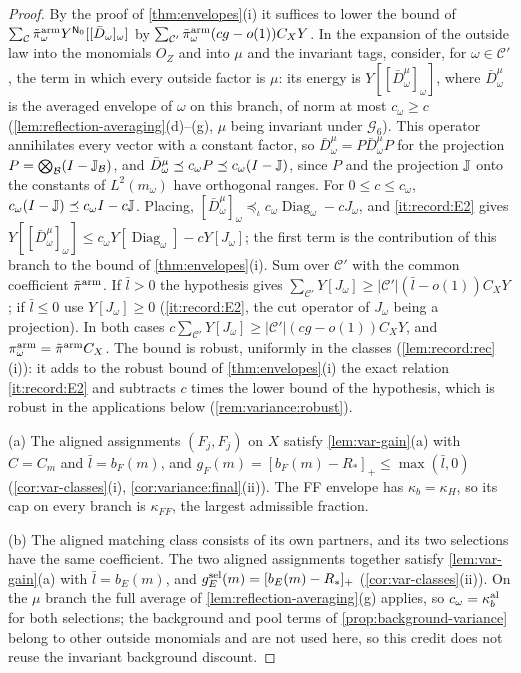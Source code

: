 \begin{proof}
By the proof of \cref{thm:envelopes}(i) it suffices to lower the bound of
$\sum_{\mathcal C}\tilde\pi^{\rm arm}_\omega Y^{\mathsf N_0}[[\bar D_\omega]_\omega]$ by
$\sum_{\mathcal C'}\tilde\pi^{\rm arm}_\omega(cg-o(1))C_XY$. In the expansion of the outside law
into the monomials $O_Z$ and into $\mu$ and the invariant tags, consider, for
$\omega\in\mathcal C'$, the term in which every outside factor is $\mu$: its energy is
$Y[[\bar D^\mu_\omega]_\omega]$, where $\bar D^\mu_\omega$ is the averaged envelope of $\omega$ on
this branch, of norm at most $c_\omega\ge c$ (\cref{lem:reflection-averaging}(d)--(g), $\mu$
being invariant under $\mathcal G_6$). This operator annihilates every vector with a constant factor, so
$\bar D^\mu_\omega=P\bar D^\mu_\omega P$ for the projection $P=\bigotimes_\mathcal B(I-\mathbb J_\mathcal B)$, and
$\bar D^\mu_\omega\preceq c_\omega P\preceq c_\omega(I-\mathbb J)$, since $P$ and the projection
$\mathbb J$ onto the constants of $L^2(m_\omega)$ have orthogonal ranges. For $0\le c\le
c_\omega$, $c_\omega(I-\mathbb J)\preceq c_\omega I-c\mathbb J$. Placing,
$[\bar D^\mu_\omega]_\omega\preceq_\iota c_\omega\operatorname{Diag}_\omega-cJ_\omega$, and \ref{it:record:E2}
gives $Y[[\bar D^\mu_\omega]_\omega]\le c_\omega Y[\operatorname{Diag}_\omega]-cY[J_\omega]$; the first term
is the contribution of this branch to the bound of \cref{thm:envelopes}(i). Sum
over $\mathcal C'$ with the common coefficient $\tilde\pi^{\rm arm}$. If $\bar l>0$ the
hypothesis gives $\sum_{\mathcal C'}Y[J_\omega]\ge|\mathcal C'|(\bar l-o(1))C_XY$; if $\bar l\le0$ use
$Y[J_\omega]\ge0$ (\ref{it:record:E2}, the cut operator of $J_\omega$ being a projection).
In both cases $c\sum_{\mathcal C'}Y[J_\omega]\ge|\mathcal C'|(cg-o(1))C_XY$, and
$\pi^{\rm arm}_\omega=\tilde\pi^{\rm arm}C_X$. The bound is robust, uniformly in the classes
(\cref{lem:record:rec}(i)): it adds to the robust bound of \cref{thm:envelopes}(i)
the exact relation \ref{it:record:E2} and subtracts $c$ times the lower bound of the
hypothesis, which is robust in the applications below (\cref{rem:variance:robust}).

(a) The aligned assignments $(F_j,F_j)$ on $X$ satisfy \cref{lem:var-gain}(a) with
$C=C_m$ and $\bar l=b_F(m)$, and $g_F(m)=[b_F(m)-R_*]_+\le\max(\bar l,0)$
(\cref{cor:var-classes}(i), \cref{cor:variance:final}(ii)). The FF envelope has
$\kappa_b=\kappa_H$, so its cap on every branch is $\kappa_{FF}$, the largest admissible
fraction.

(b) The aligned matching class consists of its own partners, and its two
selections have the same coefficient. The two aligned assignments together satisfy
\cref{lem:var-gain}(a) with $\bar l=b_E(m)$, and $g^{\rm sel}_E(m)=[b_E(m)-R_*]_+$
(\cref{cor:var-classes}(ii)). On the $\mu$ branch the full average of
\cref{lem:reflection-averaging}(g) applies, so $c_\omega=\kappa^{\rm al}_b$ for both selections;
the background and pool terms of \cref{prop:background-variance} belong to other
outside monomials and are not used here, so this credit does not reuse the invariant
background discount.


\end{proof}
